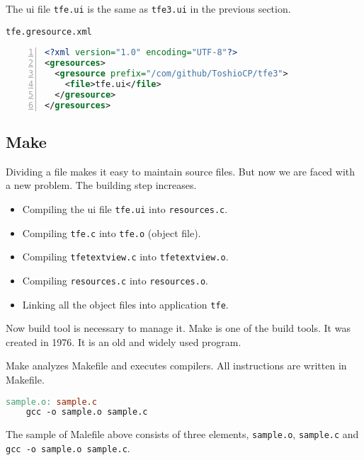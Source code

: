 The ui file \passthrough{\lstinline!tfe.ui!} is the same as
\passthrough{\lstinline!tfe3.ui!} in the previous section.

\passthrough{\lstinline!tfe.gresource.xml!}

\begin{lstlisting}[language=XML, numbers=left]
<?xml version="1.0" encoding="UTF-8"?>
<gresources>
  <gresource prefix="/com/github/ToshioCP/tfe3">
    <file>tfe.ui</file>
  </gresource>
</gresources>
\end{lstlisting}

\hypertarget{make}{%
\subsection{Make}\label{make}}

Dividing a file makes it easy to maintain source files. But now we are
faced with a new problem. The building step increases.

\begin{itemize}
\tightlist
\item
  Compiling the ui file \passthrough{\lstinline!tfe.ui!} into
  \passthrough{\lstinline!resources.c!}.
\item
  Compiling \passthrough{\lstinline!tfe.c!} into
  \passthrough{\lstinline!tfe.o!} (object file).
\item
  Compiling \passthrough{\lstinline!tfetextview.c!} into
  \passthrough{\lstinline!tfetextview.o!}.
\item
  Compiling \passthrough{\lstinline!resources.c!} into
  \passthrough{\lstinline!resources.o!}.
\item
  Linking all the object files into application
  \passthrough{\lstinline!tfe!}.
\end{itemize}

Now build tool is necessary to manage it. Make is one of the build
tools. It was created in 1976. It is an old and widely used program.

Make analyzes Makefile and executes compilers. All instructions are
written in Makefile.

\begin{lstlisting}[language=make]
sample.o: sample.c
    gcc -o sample.o sample.c
\end{lstlisting}

The sample of Malefile above consists of three elements,
\passthrough{\lstinline!sample.o!}, \passthrough{\lstinline!sample.c!}
and \passthrough{\lstinline!gcc -o sample.o sample.c!}.

